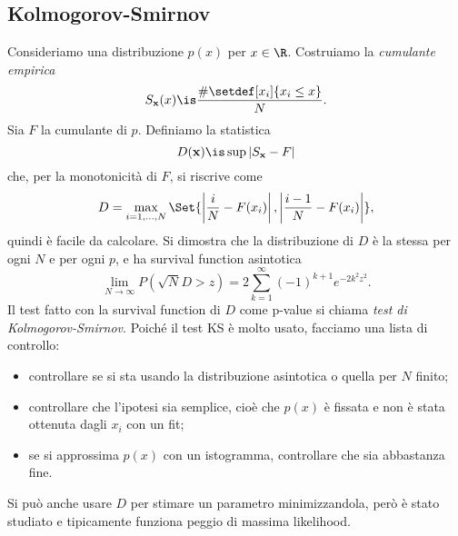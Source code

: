 \subsection{Kolmogorov-Smirnov}

Consideriamo una distribuzione $p(x)$ per $x\in\R$.
Costruiamo la \emph{cumulante empirica} 
\begin{equation*}
	S_{\mathbf x}(x)
	\is \frac {\#\setdef[x_i]{x_i\le x}} N.
\end{equation*}
Sia $F$ la cumulante di $p$.
Definiamo la statistica
\begin{equation*}
	D(\mathbf x)
	\is \sup|S_\mathbf x-F|
\end{equation*}
che, per la monotonicità di $F$, si riscrive come
\begin{equation*}
	D = \max_{i=1,\dotsc,N} \Set{\left|\frac iN-F(x_i)\right|, \left|\frac{i-1}N-F(x_i)\right|},
\end{equation*}
quindi è facile da calcolare.
Si dimostra che la distribuzione di $D$ è la stessa per ogni $N$ e per ogni $p$,
e ha survival function asintotica
\begin{equation*}
	\lim_{N\to\infty} P(\sqrt N D>z)
	= 2 \sum_{k=1}^\infty (-1)^{k+1} e^{-2k^2z^2}.
\end{equation*}
Il test fatto con la survival function di $D$ come p-value si chiama \emph{test di Kolmogorov-Smirnov}.
Poiché il test KS è molto usato,
facciamo una lista di controllo:
\begin{itemize}
	\item controllare se si sta usando la distribuzione asintotica o quella per $N$ finito;
	\item controllare che l'ipotesi sia semplice,
	cioè che $p(x)$ è fissata e non è stata ottenuta dagli $x_i$ con un fit;
	\item se si approssima $p(x)$ con un istogramma, controllare che sia abbastanza fine.
\end{itemize}
Si può anche usare $D$ per stimare un parametro minimizzandola,
però è stato studiato e tipicamente funziona peggio di massima likelihood.
